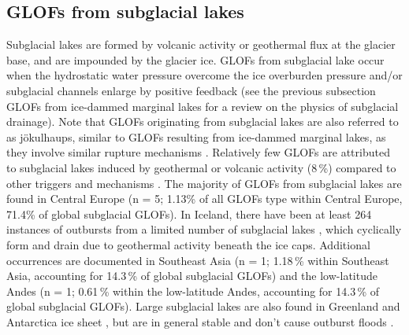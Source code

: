 
\subsection{GLOFs from subglacial lakes}
\label{subsection:glofs_subglacial_lakes}


Subglacial lakes are formed by volcanic activity or geothermal flux at the glacier base, and are impounded by the glacier ice. GLOFs from subglacial lake occur when the hydrostatic water pressure overcome the ice overburden pressure and/or subglacial channels enlarge by positive feedback (see the previous subsection GLOFs from ice-dammed marginal lakes for a review on the physics of subglacial drainage). Note that GLOFs originating from subglacial lakes are also referred to as jökulhaups, similar to GLOFs resulting from ice-dammed marginal lakes, as they involve similar rupture mechanisms \citep{Bjornsson2010}. Relatively few GLOFs are attributed to subglacial lakes induced by geothermal or volcanic activity (8\,\%) compared to other triggers and mechanisms \citep{Lutzow&al2023}. The majority of GLOFs from subglacial lakes are found in Central Europe (n = 5; 1.13\% of all GLOFs type within Central Europe, 71.4\% of global subglacial GLOFs). In Iceland, there have been at least 264 instances of outbursts from a limited number of subglacial lakes \citep{Bjornsson2003}, which cyclically form and drain due to geothermal activity beneath the ice caps. Additional occurrences are documented in Southeast Asia (n = 1; 1.18\,\% within Southeast Asia, accounting for 14.3\,\% of global subglacial GLOFs) and the low-latitude Andes (n = 1; 0.61\,\% within the low-latitude Andes, accounting for 14.3\,\% of global subglacial GLOFs). Large subglacial lakes are also found in Greenland and Antarctica ice sheet \citep{Livingstone&al2022}, but are in general stable and don't cause outburst floods \citep{Siegert&al2016,Bowling&al2019}. 

